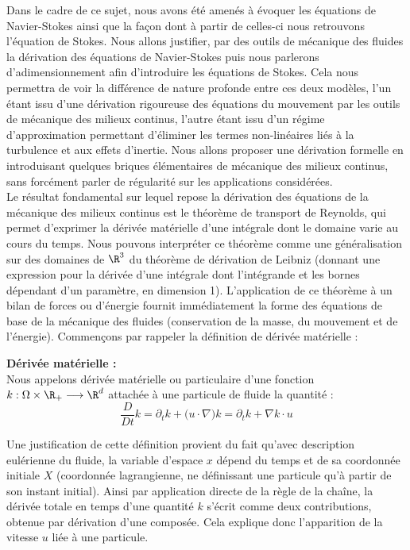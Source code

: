 Dans le cadre de ce sujet, nous avons été amenés à évoquer les équations de Navier-Stokes ainsi que la façon dont à partir de celles-ci nous retrouvons l'équation de Stokes. Nous allons justifier, par des outils de mécanique des fluides la dérivation 
des équations de Navier-Stokes puis nous parlerons d'adimensionnement afin d'introduire les équations de Stokes. Cela nous permettra de voir la différence de nature profonde entre ces deux modèles, l'un étant issu d'une dérivation rigoureuse des équations du mouvement 
par les outils de mécanique des milieux continus, l'autre étant issu d'un régime d'approximation permettant d'éliminer les termes non-linéaires liés à la turbulence et aux effets d'inertie. Nous allons proposer une dérivation formelle en introduisant quelques briques élémentaires de mécanique des milieux continus, sans forcément parler de régularité sur les applications considérées. \\
Le résultat fondamental sur lequel repose la dérivation des équations de la mécanique des milieux continus est le théorème de transport de Reynolds, qui permet d'exprimer la dérivée matérielle d'une intégrale dont le domaine varie au cours du temps. Nous pouvons interpréter ce théorème comme une généralisation 
sur des domaines de $\R^3$ du théorème de dérivation de Leibniz (donnant une expression pour la dérivée d'une intégrale dont l'intégrande et les bornes dépendant d'un paramètre, en dimension 1).
L'application de ce théorème à un bilan de forces ou d'énergie fournit immédiatement la forme des équations de base de la mécanique des fluides (conservation de la masse, du mouvement et de l'énergie).
Commençons par rappeler la définition de dérivée matérielle :
\begin{definitionbox}
    \begin{definition}
        \textbf{Dérivée matérielle :} \\
        Nous appelons dérivée matérielle ou particulaire d'une fonction $k : \Omega \times \R_+ \longrightarrow \R^d$ attachée à une particule de fluide la quantité :
        $$ \frac{D}{Dt}k = \partial_t k + \big(u \cdot \nabla\big)k = \partial_t k + \nabla k \cdot u$$
    \end{definition}
\end{definitionbox}
Une justification de cette définition provient du fait qu'avec description eulérienne du fluide, la variable d'espace $x$ dépend du temps et de sa coordonnée initiale $X$ (coordonnée lagrangienne, ne définissant une particule qu'à partir de son instant initial).
Ainsi par application directe de la règle de la chaîne, la dérivée totale en temps d'une quantité $k$ s'écrit comme deux contributions, obtenue par dérivation d'une composée. Cela explique donc l'apparition de la vitesse $u$ liée à une particule. \\
